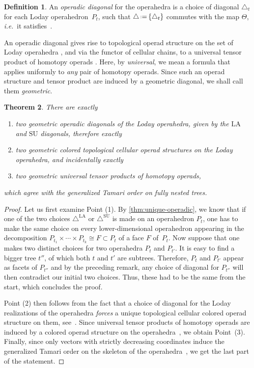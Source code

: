 \documentclass{amsart}
\newcommand{\darkblue}{\color{darkblue}} %
\newtheorem{theorem}{Theorem}[section]
\theoremstyle{definition}
\newtheorem{definition}[theorem]{Definition}
\newcommand{\eqdef}{\mbox{\,\raisebox{0.2ex}{\scriptsize\ensuremath{\mathrm:}}\ensuremath{=}\,}} %
\newcommand{\ie}{\textit{i.e.}~} %
\newcommand{\defn}[1]{\textsl{\darkblue #1}} %
\newcommand{\SU}{\mathrm{SU}}
\newcommand{\LA}{\mathrm{LA}}
\newcommand{\SUD}{\triangle^{\mathrm{SU}}}
\newcommand{\LAD}{\triangle^{\mathrm{LA}}}
\begin{document}
\begin{definition}
An \emph{operadic diagonal} for the operahedra is a choice of diagonal $\triangle_t$ for each Loday operahedron~$P_t$, such that $\triangle \eqdef \{\triangle_t\}$ commutes with the map $\Theta$, \ie it satisfies~\cite[Prop.~4.14]{LaplanteAnfossi}.
\end{definition}

An operadic diagonal gives rise to topological operad structure on the set of Loday operahedra \cite[Thm 4.18]{LaplanteAnfossi}, and via the functor of cellular chains, to a universal tensor product of homotopy operads \cite[Prop. 4.27]{LaplanteAnfossi}. 
Here, by \defn{universal}, we mean a formula that applies uniformly to \emph{any} pair of homotopy operads. 
Since such an operad structure and tensor product are induced by a geometric diagonal, we shall call them \defn{geometric}.

\begin{theorem}
\label{thm:operahedra}
There are exactly 
\begin{enumerate}
\item two geometric operadic diagonals of the Loday operahedra, given by the $\LA$ and $\SU$ diagonals, therefore exactly
\item two geometric colored topological cellular operad structures on the Loday operahedra, and incidentally exactly
\item two geometric universal tensor products of homotopy operads,
\end{enumerate}
which agree with the generalized Tamari order on fully nested trees. 
\end{theorem}

\begin{proof}
Let us first examine Point (1).
By \cref{thm:unique-operadic}, we know that if one of the two choices $\LAD$ or $\SUD$ is made on an operahedron $P_t$, one has to make the same choice on every lower-dimensional operahedron appearing in the decomposition $P_{t_1} \times \cdots \times P_{t_k} \cong F \subset P_t$ of a face $F$ of~$P_t$. 
Now suppose that one makes two distinct choices for two operahedra $P_t$ and $P_{t'}$.
It is easy to find a bigger tree $t''$, of which both $t$ and $t'$ are subtrees.
Therefore, $P_t$ and $P_{t'}$ appear as facets of $P_{t''}$ and by the preceding remark, any choice of diagonal for $P_{t''}$ will then contradict our initial two choices. 
Thus, these had to be the same from the start, which concludes the proof. 

Point (2) then follows from the fact that a choice of diagonal for the Loday realizations of the operahedra \emph{forces} a unique topological cellular colored operad structure on them, see~\cite[Thm.~4.18]{LaplanteAnfossi}.
Since universal tensor products of homotopy operads are induced by a colored operad structure on the operahedra~\cite[Coro.~4.24]{LaplanteAnfossi}, we obtain Point~(3).
Finally, since only vectors with strictly decreasing coordinates induce the generalized Tamari order on the skeleton of the operahedra~\cite[Prop.~3.11]{LaplanteAnfossi}, we get the last part of the statement. 
\end{proof}
\end{document}
